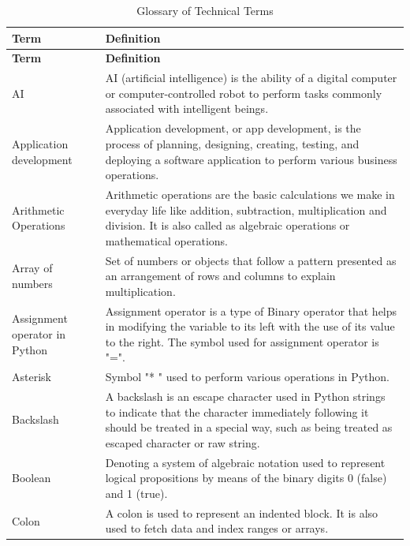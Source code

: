 \documentclass[../../data_analysis_python.tex]{subfiles}
\begin{document}
    \begin{longtable}{p{3cm} p{12cm}}
    \toprule
    \textbf{Term} & \textbf{Definition} \\
    \midrule
    \endfirsthead

    \toprule
    \textbf{Term} & \textbf{Definition} \\
    \endhead


    \bottomrule
    \caption{Glossary of Technical Terms}
    \label{tab:glossary}
    \endlastfoot


        AI & AI (artificial intelligence) is the ability of a digital computer or computer-controlled robot to perform tasks commonly associated with intelligent beings. \\ 
        \hline 
        Application development & Application development, or app development, is the process of planning, designing, creating, testing, and deploying a software application to perform various business operations. \\ 
        \hline 
        Arithmetic Operations & Arithmetic operations are the basic calculations we make in everyday life like addition, subtraction, multiplication and division. It is also called as algebraic operations or mathematical operations. \\ 
        \hline 
        Array of numbers & Set of numbers or objects that follow a pattern presented as an arrangement of rows and columns to explain multiplication. \\ 
        \hline 
        Assignment operator in Python & Assignment operator is a type of Binary operator that helps in modifying the variable to its left with the use of its value to the right. The symbol used for assignment operator is "=". \\ 
        \hline 
        Asterisk & Symbol "* " used to perform various operations in Python. \\ 
        \hline 
        Backslash & A backslash is an escape character used in Python strings to indicate that the character immediately following it should be treated in a special way, such as being treated as escaped character or raw string. \\ 
        \hline 
        Boolean & Denoting a system of algebraic notation used to represent logical propositions by means of the binary digits 0 (false) and 1 (true). \\ 
        \hline 
        Colon & A colon is used to represent an indented block. It is also used to fetch data and index ranges or arrays. \\ 

\end{longtable}
\end{document}
